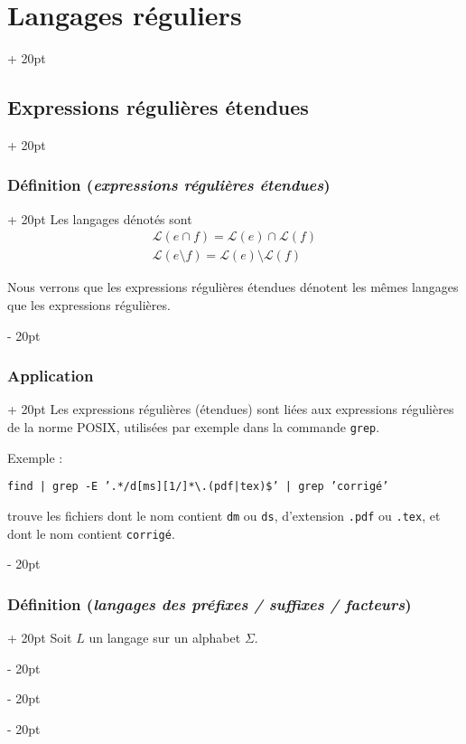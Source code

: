 \documentclass[a4paper, 12pt, twoside]{article}
\newcommand{\ind}[1][20pt]{\advance\leftskip + #1}
\newcommand{\deind}[1][20pt]{\advance\leftskip - #1}
\newenvironment{indt}[2][20pt]{#2 \par \ind[#1]}{\par \deind} %
\begin{document}
\begin{indt}{\section{Langages réguliers}}
\begin{indt}{\subsection{Expressions régulières étendues}}
\begin{indt}{\subsubsection{Définition (\textit{expressions régulières étendues})}}
                Les langages dénotés sont
                \[
                    \begin{array}{l}
                        \mathcal L(e \cap f) = \mathcal L(e) \cap \mathcal L(f)
                        \\
                        \mathcal L(e\setminus f) = \mathcal L(e) \setminus \mathcal L(f)
                    \end{array}
                \]

                Nous verrons que les expressions régulières étendues dénotent les mêmes langages que les expressions régulières.
            \end{indt}

            \vspace{12pt}
            
            \begin{indt}{\subsubsection{Application}}
                Les expressions régulières (étendues) sont liées aux expressions régulières de la norme POSIX, utilisées par exemple dans la commande \texttt{grep}.

                Exemple :
                \begin{center}
                    \texttt{find | grep -E '.*/d[ms][1/]*\textbackslash .(pdf|tex)\$' | grep 'corrigé'}
                \end{center}
                trouve les fichiers dont le nom contient \texttt{dm} ou \texttt{ds}, d'extension \texttt{.pdf} ou \texttt{.tex}, et dont le nom contient \texttt{corrigé}.
            \end{indt}

            \vspace{12pt}
            
            \begin{indt}{\subsubsection{Définition (\textit{langages des préfixes / suffixes / facteurs})}}
                Soit $L$ un langage sur un alphabet $\Sigma$.


\end{indt}
\end{indt}
\end{indt}
\end{document}

